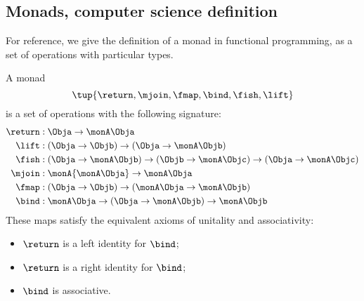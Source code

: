 
\subsection{Monads, computer science definition}
\label{sec:monads-CS}
For reference, we give the definition of a monad in functional programming,
as a set of operations with particular types.

\begin{definition}
    \label{def:monad-computer-science}
    A monad \begin{equation}
        \tup{\return,\mjoin,\fmap,\bind,\fish,\lift}
    \end{equation}
    is a set of operations with the following signature:
    \begin{align*}
        \return & :\Obja\to\monA \Obja \\
        \lift   & :(\Obja\to \Objb)\to( \Obja\to\monA \Objb) \\
        \fish   & :(\Obja\to\monA \Objb)\to(\Objb\to\monA \Objc)\to(\Obja\to\monA \Objc) \\
        \mjoin  & :\monA{\monA \Obja}\to\monA \Obja \\
        \fmap   & :(\Obja\to \Objb)\to(\monA \Obja\to\monA \Objb) \\
        \bind   & :\monA \Obja\to(\Obja\to\monA \Objb)\to\monA \Objb
    \end{align*}
    These maps satisfy the equivalent axioms of unitality and associativity:
    \begin{itemize}
        \item $\return$ is a left identity for $\bind$;
        \item $\return$ is a right identity for $\bind$;
        \item $\bind$ is associative.
    \end{itemize}
\end{definition}

